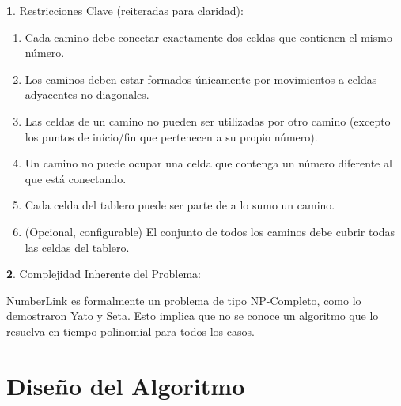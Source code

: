 \documentclass[spanish]{article}
\numberwithin{equation}{section}
\numberwithin{figure}{section}
\theoremstyle{definition}
\newtheorem*{defn*}{\protect\definitionname}
\begin{document}
\begin{defn*}
    Restricciones Clave (reiteradas para claridad):
\end{defn*}
\begin{enumerate}
    \item Cada camino debe conectar exactamente dos celdas que contienen el mismo número.
    \item Los caminos deben estar formados únicamente por movimientos a celdas adyacentes no diagonales.
    \item Las celdas de un camino no pueden ser utilizadas por otro camino (excepto los puntos de inicio/fin que pertenecen a su propio número).
    \item Un camino no puede ocupar una celda que contenga un número diferente al que está conectando.
    \item Cada celda del tablero puede ser parte de a lo sumo un camino.
    \item (Opcional, configurable) El conjunto de todos los caminos debe cubrir todas las celdas del tablero.
\end{enumerate}

\begin{defn*}
    Complejidad Inherente del Problema:
\end{defn*}
NumberLink es formalmente un problema de tipo NP-Completo, como lo demostraron Yato y Seta. Esto implica que no se conoce un algoritmo que lo resuelva en tiempo polinomial para todos los casos.

\section{Diseño del Algoritmo}
\end{document}
